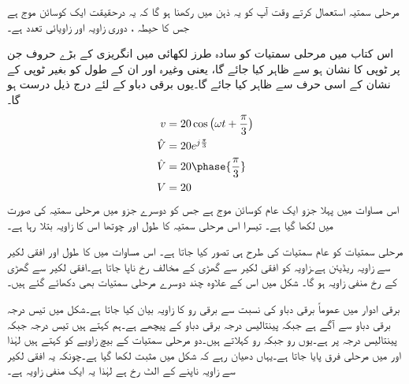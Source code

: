 مرحلی سمتیہ استعمال کرتے وقت آپ کو یہ ذہن میں رکھنا ہو گا کہ یہ درحقیقت ایک کوسائن موج ہے جس کا حیطہ   ، دوری زاویہ  اور زاویائی تعدد  ہے۔

اس کتاب میں مرحلی سمتیات کو سادہ طرز لکھائی میں انگریزی کے بڑے حروف جن پر ٹوپی کا نشان ہو سے ظاہر کیا جائے گا، یعنی   وغیرہ اور ان کے طول کو بغیر ٹوپی کے نشان کے اسی حرف سے ظاہر کیا جائے گا۔یوں برقی دباو  کے لئے درج ذیل درست ہو گا۔
\begin{gather}
\begin{aligned}
v&=20 \cos \big(\omega t +\frac{\pi}{3}\big)\\
\hat{V}&=20 e^{j \frac{\pi}{3}}\\
\hat{V}&=20 \phase{\frac{\pi}{3}}\\
V&=20
\end{aligned}
\end{gather}
اس مساوات میں پہلا جزو ایک عام کوسائن موج ہے جس کو دوسرے جزو میں مرحلی سمتیہ کی صورت میں لکھا گیا ہے۔ تیسرا اس مرحلی سمتیہ کا طول اور چوتھا اس کا زاویہ بتلا رہا ہے۔

مرحلی سمتیات کو عام سمتیات کی طرح ہی تصور کیا جاتا ہے۔ اس مساوات میں  کا طول  اور افقی لکیر سے زاویہ   ریڈیئن ہے۔زاویہ  کو افقی لکیر سے گھڑی کے مخالف رخ ناپا جاتا ہے۔افقی لکیر سے گھڑی کے رخ  منفی زاویہ ہو گا۔ شکل  میں اس  کے علاوہ چند دوسرے  مرحلی سمتیات بھی  دکھائے گئے ہیں۔

برقی ادوار میں عموماً برقی دباو  کی نسبت سے  برقی رو   کا زاویہ بیان کیا جاتا ہے۔شکل    میں  تیس درجہ برقی دباو سے آگے ہے جبکہ    پینتالیس درجہ  برقی دباو کے  پیچھے  ہے۔ہم کہتے ہیں  تیس درجہ    جبکہ   پینتالیس درجہ   پر ہے۔یوں     رو جبکہ     رو کہلاتے ہیں۔دو مرحلی سمتیات کے بیچ زاویے کو  کہتے ہیں لہٰذا  اور  میں   مرحلی فرق پایا جاتا ہے۔یہاں  دھیان رہے کہ شکل  میں   مثبت لکھا گیا ہے۔چونکہ یہ افقی لکیر سے زاویہ ناپنے کے الٹ رخ ہے لہٰذا یہ ایک منفی زاویہ ہے۔

